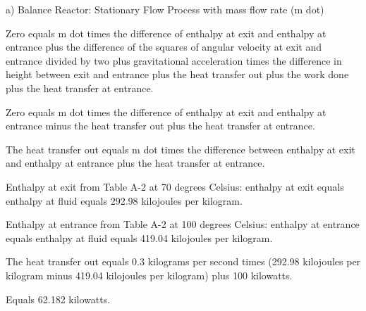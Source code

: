 a) Balance Reactor: Stationary Flow Process with mass flow rate (m dot)

Zero equals m dot times the difference of enthalpy at exit and enthalpy at entrance plus the difference of the squares of angular velocity at exit and entrance divided by two plus gravitational acceleration times the difference in height between exit and entrance plus the heat transfer out plus the work done plus the heat transfer at entrance.

Zero equals m dot times the difference of enthalpy at exit and enthalpy at entrance minus the heat transfer out plus the heat transfer at entrance.

The heat transfer out equals m dot times the difference between enthalpy at exit and enthalpy at entrance plus the heat transfer at entrance.

Enthalpy at exit from Table A-2 at 70 degrees Celsius: enthalpy at exit equals enthalpy at fluid equals 292.98 kilojoules per kilogram.

Enthalpy at entrance from Table A-2 at 100 degrees Celsius: enthalpy at entrance equals enthalpy at fluid equals 419.04 kilojoules per kilogram.

The heat transfer out equals 0.3 kilograms per second times (292.98 kilojoules per kilogram minus 419.04 kilojoules per kilogram) plus 100 kilowatts.

Equals 62.182 kilowatts.